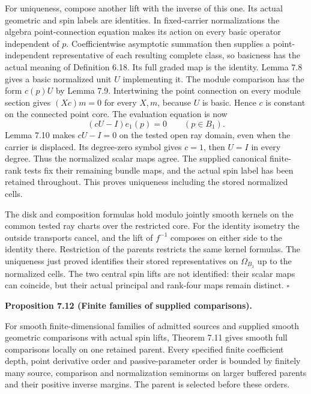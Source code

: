 \documentclass[
  english,
  11pt,
  reqno]{amsart}
\makeatletter
\newcommand{\pandocstatementheading}[1]{%
  \par\if@nobreak\else
    \addpenalty{\@beginparpenalty}%
    \addvspace{.5\baselineskip plus .2\baselineskip minus .2\baselineskip}%
  \fi
  {\normalfont\bfseries #1\par}%
  \nobreak\@afterindenttrue\@afterheading
}
\makeatother
\begin{document}
For uniqueness, compose another lift with the inverse of this one. Its
actual geometric and spin labels are identities. In fixed-carrier
normalizations the algebra point-connection equation makes its action on
every basic operator independent of \(p\). Coefficientwise asymptotic
summation then supplies a point-independent representative of each
resulting complete class, so basicness has the actual meaning of
Definition 6.18. Its full graded map is the identity. Lemma 7.8 gives a
basic normalized unit \(U\) implementing it. The module comparison has
the form \(c(p)U\) by Lemma 7.9. Intertwining the point connection on
every module section gives \((Xc)m=0\) for every \(X,m\), because \(U\)
is basic. Hence \(c\) is constant on the connected point core. The
evaluation equation is now%
 \[
(cU-I)e_1(p)=0\qquad(p\in B_1).
\] Lemma 7.10 makes \(cU-I=0\) on the tested open ray domain, even when
the carrier is displaced. Its degree-zero symbol gives \(c=1\), then
\(U=I\) in every degree. Thus the normalized scalar maps agree. The
supplied canonical finite-rank tests fix their remaining bundle maps,
and the actual spin label has been retained throughout. This proves
uniqueness including the stored normalized cells.

The disk and composition formulas hold modulo jointly smooth kernels on
the common tested ray charts over the restricted core. For the identity
isometry the outside transports cancel, and the lift of \(f^{-1}\)
composes on either side to the identity there. Restriction of the
parents restricts the same kernel formulas. The uniqueness just proved
identifies their stored representatives on \(\Omega_{B_1}\) up to the
normalized cells. The two central spin lifts are not identified: their
scalar maps can coincide, but their actual principal and rank-four maps
remain distinct. \hfill\(\square\)

\pandocstatementheading{\leavevmode{}\label{prop:online-full-comparison-finite-families}Proposition 7.12 (Finite families of supplied comparisons).}

For smooth finite-dimensional families of admitted sources and supplied
smooth geometric comparisons with actual spin lifts, Theorem 7.11 gives
smooth full comparisons locally on one retained parent. Every specified
finite coefficient depth, point derivative order and passive-parameter
order is bounded by finitely many source, comparison and normalization
seminorms on larger buffered parents and their positive inverse margins.
The parent is selected before these orders.
\end{document}
